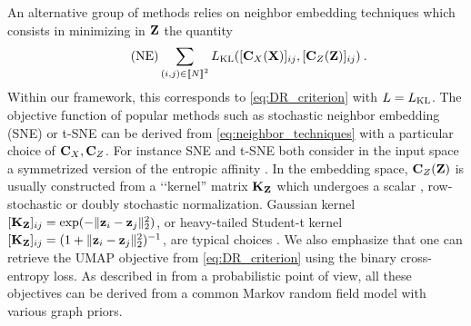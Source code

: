 An alternative group of methods relies on neighbor embedding techniques which consists in minimizing in ${\mathbf{Z}}$ the quantity
\begin{equation}\tag{NE}
	\label{eq:neighbor_techniques}
	\sum_{(i,j) \in {[\![N]\!]}^2} L_{\operatorname{KL}}([{\mathbf{C}}_{X}({\mathbf{X}})]_{ij}, [{\mathbf{C}}_{Z}({\mathbf{Z}})]_{ij}) \:.
\end{equation}
Within our framework, this corresponds to \cref{eq:DR_criterion} with $L = L_{\operatorname{KL}}$. The objective function of popular methods such as stochastic neighbor embedding (SNE) \citep{hinton2002stochastic} or t-SNE \citep{van2008visualizing} can be derived from \cref{eq:neighbor_techniques} with a particular choice of ${\mathbf{C}}_{X}, {\mathbf{C}}_{Z}$. For instance SNE and t-SNE both consider in the input space a symmetrized version of the entropic affinity \citep{vladymyrov2013entropic,van2023snekhorn}. In the embedding space, ${\mathbf{C}}_Z({\mathbf{Z}})$ is usually constructed from a ‘‘kernel'' matrix ${\mathbf{K}}_{\mathbf{Z}}$ which undergoes a scalar \citep{van2008visualizing}, row-stochastic \citep{hinton2002stochastic} or doubly stochastic \citep{lu2019doubly,van2023snekhorn} normalization. Gaussian kernel $[{\mathbf{K}}_{\mathbf{Z}}]_{ij} = \exp(-\|{\mathbf{z}}_i-{\mathbf{z}}_j\|_2^2)$, or heavy-tailed Student-t kernel $[{\mathbf{K}}_{\mathbf{Z}}]_{ij} = (1+\|{\mathbf{z}}_i-{\mathbf{z}}_j\|_2^2)^{-1}$, are typical choices \citep{van2008visualizing}. We also emphasize that one can retrieve the UMAP objective \citep{mcinnes2018umap} from \cref{eq:DR_criterion} using the binary cross-entropy loss. As described in \citep{van2022probabilistic} from a probabilistic point of view, all these objectives can be derived from a common Markov random field model with various graph priors.

